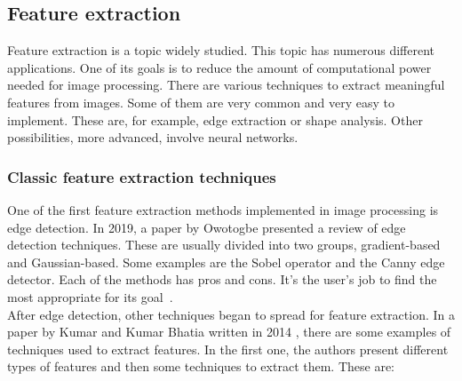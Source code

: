 \documentclass[conference]{IEEEtran}
\begin{document}
	\subsection{Feature extraction}

		Feature extraction is a topic widely studied. 
		This topic has numerous different applications. 
		One of its goals is to reduce the amount of computational power needed for image processing. 
		There are various techniques to extract meaningful features from images. 
		Some of them are very common and very easy to implement. 
		These are, for example, edge extraction or shape analysis. 
		Other possibilities, more advanced, involve neural networks.\\

			\subsubsection{Classic feature extraction techniques}
				
				One of the first feature extraction methods implemented in image processing is edge detection.				
				In 2019, a paper by Owotogbe presented a review of edge detection techniques. 
				These are usually divided into two groups, gradient-based and Gaussian-based. 
				Some examples are the Sobel operator and the Canny edge detector. 
				Each of the methods has pros and cons. 
				It's the user's job to find the most appropriate for its goal~\cite{1}.\\
				
				After edge detection, other techniques began to spread for feature extraction. 
				In a paper by Kumar and Kumar Bhatia written in 2014 \cite{2}, 
				there are some examples of techniques used to extract features. 
				In the first one, the authors present different types of features and then some techniques to extract them. 
				These are:
\end{document}
